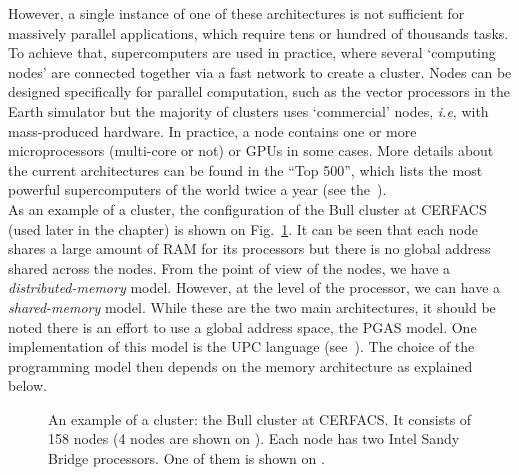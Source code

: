 %
However, a single instance of one of these architectures is not sufficient for
massively parallel applications, which require tens or hundred of thousands
tasks. To achieve that, supercomputers are used in practice, where
several `computing nodes' are connected together via a fast network to create a cluster.
Nodes can be designed specifically for parallel computation, such as the vector
processors in the Earth simulator but the majority of clusters uses
`commercial' nodes, \textit{i.e}, with mass-produced hardware. In practice, a
node contains one or more microprocessors (multi-core or not) or GPUs in some
cases. More details about the current architectures can be found in the
\enquote{Top 500}, which lists the most powerful supercomputers of the world twice a year
(see the~).\\
As an example of a cluster, the configuration of the Bull cluster at CERFACS
(used later in the chapter) is shown on Fig.~\ref{fig:bull_cluster}. It can be
seen that each node shares a large amount of RAM for its processors but there is
no global address shared across the nodes. From the point of view of the nodes,
we have a \textit{distributed-memory} model. However, at the level of the processor, we
can have a \textit{shared-memory} model.  While these are the two main architectures,
it should be noted there is an effort to use a global address space, the
\gls{PGAS} model. One implementation of this model is the \gls{UPC} language
(see~\cite{Carlson1999}).  The choice of the programming model then depends on
the memory architecture as explained below.

\begin{figure}
  \hfill
  \caption{An example of a cluster: the Bull cluster at CERFACS\@. It consists of
  158 nodes (4 nodes are shown on ). Each node has
  two Intel Sandy Bridge processors. One of them is shown on
  .}
\label{fig:bull_cluster}
\end{figure}


